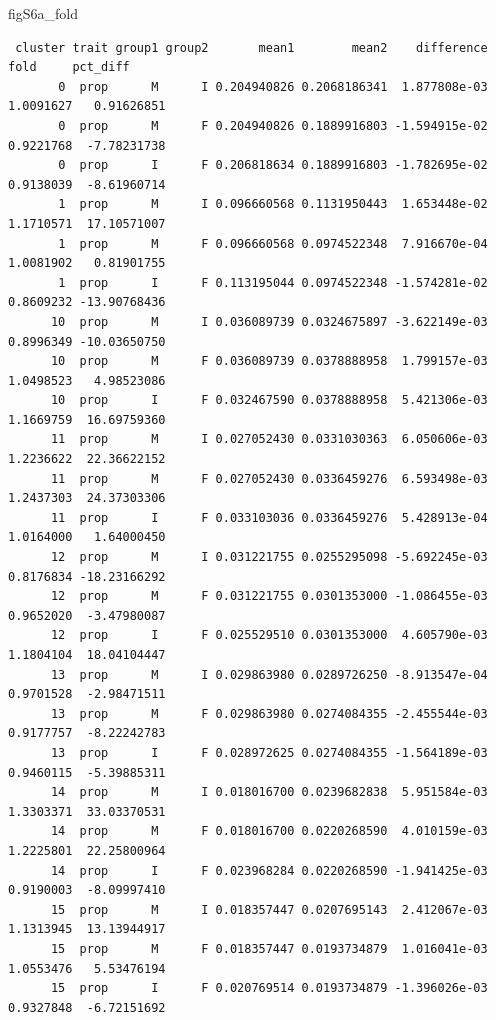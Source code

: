 \documentclass[
  landscape]{article}
\newenvironment{Shaded}{\begin{snugshade}}{\end{snugshade}}
\newcommand{\NormalTok}[1]{#1}
\begin{document}
\begin{Shaded}
\begin{Highlighting}[]
\NormalTok{figS6a\_fold}
\end{Highlighting}
\end{Shaded}

\begin{verbatim}
 cluster trait group1 group2       mean1        mean2    difference      fold     pct_diff
       0  prop      M      I 0.204940826 0.2068186341  1.877808e-03 1.0091627   0.91626851
       0  prop      M      F 0.204940826 0.1889916803 -1.594915e-02 0.9221768  -7.78231738
       0  prop      I      F 0.206818634 0.1889916803 -1.782695e-02 0.9138039  -8.61960714
       1  prop      M      I 0.096660568 0.1131950443  1.653448e-02 1.1710571  17.10571007
       1  prop      M      F 0.096660568 0.0974522348  7.916670e-04 1.0081902   0.81901755
       1  prop      I      F 0.113195044 0.0974522348 -1.574281e-02 0.8609232 -13.90768436
      10  prop      M      I 0.036089739 0.0324675897 -3.622149e-03 0.8996349 -10.03650750
      10  prop      M      F 0.036089739 0.0378888958  1.799157e-03 1.0498523   4.98523086
      10  prop      I      F 0.032467590 0.0378888958  5.421306e-03 1.1669759  16.69759360
      11  prop      M      I 0.027052430 0.0331030363  6.050606e-03 1.2236622  22.36622152
      11  prop      M      F 0.027052430 0.0336459276  6.593498e-03 1.2437303  24.37303306
      11  prop      I      F 0.033103036 0.0336459276  5.428913e-04 1.0164000   1.64000450
      12  prop      M      I 0.031221755 0.0255295098 -5.692245e-03 0.8176834 -18.23166292
      12  prop      M      F 0.031221755 0.0301353000 -1.086455e-03 0.9652020  -3.47980087
      12  prop      I      F 0.025529510 0.0301353000  4.605790e-03 1.1804104  18.04104447
      13  prop      M      I 0.029863980 0.0289726250 -8.913547e-04 0.9701528  -2.98471511
      13  prop      M      F 0.029863980 0.0274084355 -2.455544e-03 0.9177757  -8.22242783
      13  prop      I      F 0.028972625 0.0274084355 -1.564189e-03 0.9460115  -5.39885311
      14  prop      M      I 0.018016700 0.0239682838  5.951584e-03 1.3303371  33.03370531
      14  prop      M      F 0.018016700 0.0220268590  4.010159e-03 1.2225801  22.25800964
      14  prop      I      F 0.023968284 0.0220268590 -1.941425e-03 0.9190003  -8.09997410
      15  prop      M      I 0.018357447 0.0207695143  2.412067e-03 1.1313945  13.13944917
      15  prop      M      F 0.018357447 0.0193734879  1.016041e-03 1.0553476   5.53476194
      15  prop      I      F 0.020769514 0.0193734879 -1.396026e-03 0.9327848  -6.72151692

\end{verbatim}
\end{document}
